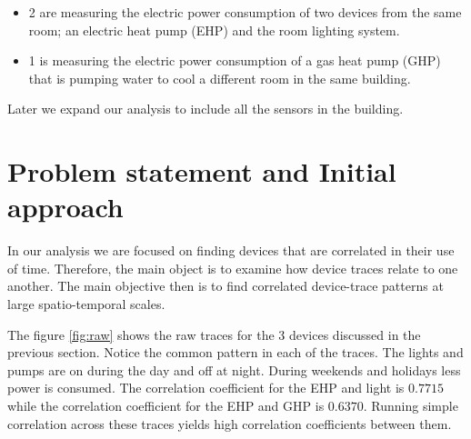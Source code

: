 \begin{itemize}
 \item 2 are measuring the electric power consumption of two devices from the same room; an electric heat 
 		pump (EHP) and the room lighting system.
 \item 1 is measuring the electric power consumption of a gas heat pump (GHP) that is pumping water to cool 
 		a different room in the same building.
\end{itemize}

Later we expand our analysis to include all the sensors in the building.

\section{Problem statement and Initial approach}\label{problem}
In our analysis we are focused on finding devices that are correlated in their use of time.  Therefore, the
main object is to examine how device traces relate to one another.  The main objective then is to find
correlated device-trace patterns at large spatio-temporal scales.  

The figure \ref{fig:raw} shows the raw traces for the 3 devices discussed in the previous section.
Notice the common pattern in each of the traces.  The lights and pumps are on during the day and off at night.
During weekends and holidays less power is consumed.  The correlation coefficient for 
 the EHP and light is $0.7715$ while the  correlation coefficient for the EHP and GHP is $0.6370$.
Running simple correlation across these traces yields high correlation coefficients between them.


